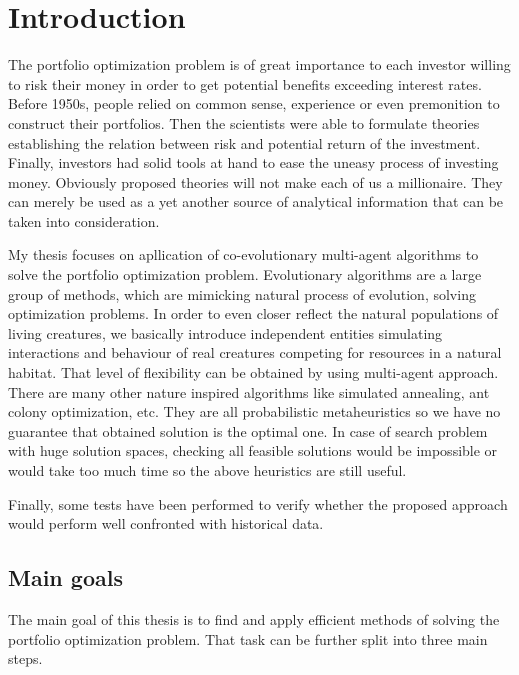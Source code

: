 \chapter{Introduction}
\label{cha:introduction}

The portfolio optimization problem is of great importance to each investor willing to risk their money in order to get potential benefits exceeding interest rates.
Before 1950s, people relied on common sense, experience or even premonition to construct their portfolios.
Then the scientists were able to formulate theories establishing the relation between risk and potential return of the investment.
Finally, investors had solid tools at hand to ease the uneasy process of investing money.
Obviously proposed theories will not make each of us a millionaire.
They can merely be used as a yet another source of analytical information that can be taken into consideration.

My thesis focuses on apllication of co-evolutionary multi-agent algorithms to solve the portfolio optimization problem.
Evolutionary algorithms are a large group of methods, which are mimicking natural process of evolution, solving optimization problems.
In order to even closer reflect the natural populations of living creatures, we basically introduce independent entities simulating interactions and behaviour of real creatures
competing for resources in a natural habitat.
That level of flexibility can be obtained by using multi-agent approach.
There are many other nature inspired algorithms like simulated annealing, ant colony optimization, etc.
They are all probabilistic metaheuristics so we have no guarantee that obtained solution is the optimal one.
In case of search problem with huge solution spaces, checking all feasible solutions would be impossible or would take too much time so the above heuristics are
 still useful.

   
Finally, some tests have been performed to verify whether the proposed approach would perform well confronted with historical data. 
     



\section{Main goals}
\label{sec:mainGoals}

The main goal of this thesis is to find and apply efficient methods of solving the portfolio optimization problem. That task can be further split into three main steps.

